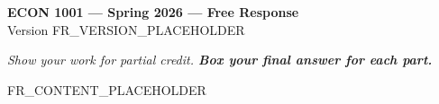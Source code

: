 \documentclass[12pt]{article}
\begin{document}
\begin{center}
  {\Large\textbf{ECON 1001 --- Spring 2026 --- Free Response}}\\[0.3em]
  {\large Version FR_VERSION_PLACEHOLDER}
\end{center}
\vspace{0.5em}
\noindent\emph{Show your work for partial credit. \textbf{Box your final answer for each part.}}
\vspace{0.5em}

\begin{questions}
  FR_CONTENT_PLACEHOLDER
\end{questions}
\end{document}

